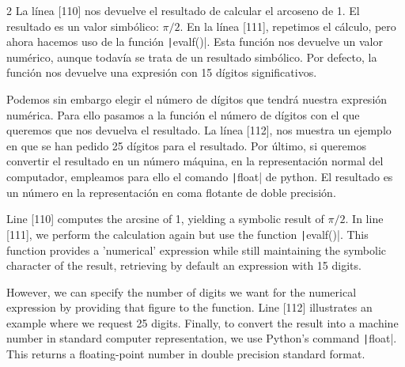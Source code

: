 \begin{paracol}{2}
La línea [110] nos devuelve el resultado de calcular el arcoseno de 1. El resultado es un valor simbólico: $\pi/2$. En la línea [111], repetimos el cálculo, pero ahora hacemos uso de la función \texttt|evalf()|. Esta función nos devuelve un valor numérico, aunque todavía se trata de un resultado simbólico. Por defecto, la función nos devuelve una expresión con 15 dígitos significativos.

Podemos sin embargo elegir el número de dígitos que tendrá nuestra expresión numérica. Para ello pasamos a la función el número de dígitos con el que queremos que nos devuelva el resultado. La línea [112], nos muestra un ejemplo en que se han pedido 25 dígitos para el resultado. Por último, si queremos convertir el resultado en un número máquina, en la representación normal del computador, empleamos para ello el comando \texttt|float| de python. El resultado es un número en la representación en coma flotante de doble precisión.

\switchcolumn
Line [110] computes the arcsine of 1, yielding a symbolic result of \(\pi/2\). In line [111], we perform the calculation again but use the function \texttt|evalf()|. This function provides a 'numerical' expression while still maintaining the symbolic character of the result, retrieving by default an expression with 15 digits.

However, we can specify the number of digits we want for the numerical expression by providing that figure to the function. Line [112] illustrates an example where we request 25 digits. Finally, to convert the result into a machine number in standard computer representation, we use Python's command \texttt|float|. This returns a floating-point number in double precision standard format.

\end{paracol}

